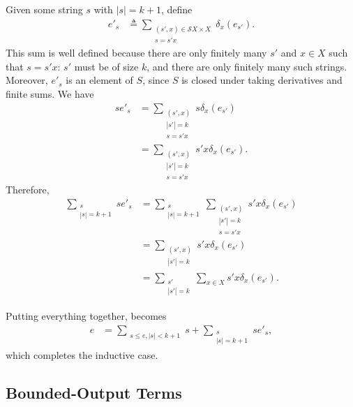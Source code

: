 \documentclass[a4paper,UKenglish,cleveref, autoref, thm-restate]{lipics-v2021}
\begin{document}
\begin{proofEnd}
  Given some string $s$ with $|s| = k+1$, define
  \begin{align*}
    e'_s
    &  \triangleq 
       \sum _{\substack{(s', x)  \in  \mathcal{S}X  \times  X \\ s = s'x}}  \delta _x(e_{s'}).
  \end{align*}
  This sum is well defined because there are only finitely many $s'$ and $x  \in  X$
  such that $s = s'x$: $s'$ must be of size $k$, and there are only finitely
  many such strings.  Moreover, $e'_s$ is an element of $S$, since $S$ is closed
  under taking derivatives and finite sums. We have
  \begin{align*}
    se'_s
    & =  \sum _{\substack{(s',x) \\ |s'| = k \\ s = s'x}} s \delta _x(e_{s'}) \\
    & =  \sum _{\substack{(s',x) \\ |s'| = k \\ s = s'x}} s'x \delta _x(e_{s'}).
  \end{align*}
  Therefore,
  \begin{align*}
     \sum _{\substack{s \\ |s|=k+1}} se'_s
    & =  \sum _{\substack{s \\ |s|=k+1}} \sum _{\substack{(s',x) \\ |s'| = k\\ s = s'x}} s'x \delta _x(e_{s'}) \\
    & =  \sum _{\substack{(s',x) \\ |s'| = k}} s'x \delta _x(e_{s'}) \\
    & =  \sum _{\substack{s' \\ |s'| = k}} \sum _{x  \in  X} s'x \delta _x(e_{s'}).
  \end{align*}

  Putting everything together,  becomes
  \begin{align}
    e & =  \sum _{\substack{s  \leq  e, |s| < k+1}} s +  \sum _{\substack{s \\ |s|=k+1}}se'_s
    \label{eq:expansion-3},
  \end{align}
  which completes the inductive case.
\end{proofEnd}

\subsection{Bounded-Output Terms}
\label{sec:bounded-output}
\end{document}
